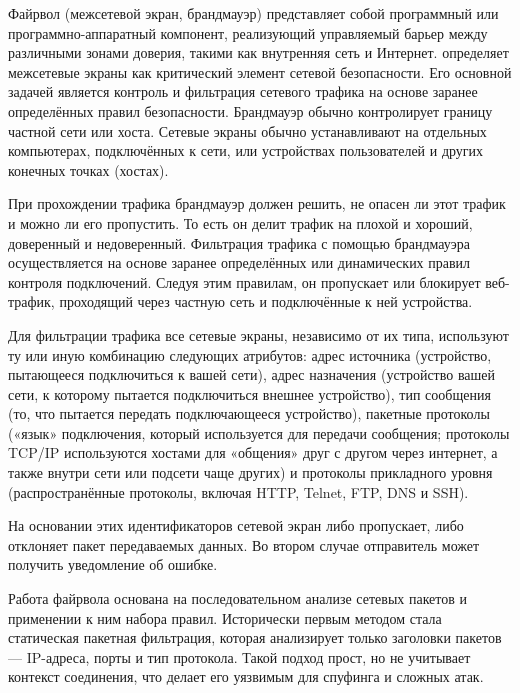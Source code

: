 \documentclass{SibFU-docs}
\begin{document}
Файрвол (межсетевой экран, брандмауэр) представляет собой программный или программно-аппаратный компонент, реализующий управляемый барьер между различными зонами доверия, такими как внутренняя сеть и Интернет. \cite{cheswick2003firewalls} определяет межсетевые экраны как критический элемент сетевой безопасности. Его основной задачей является контроль и фильтрация сетевого трафика на основе заранее определённых правил безопасности. Брандмауэр обычно контролирует границу частной сети или хоста. Сетевые экраны обычно устанавливают на отдельных компьютерах, подключённых к сети, или устройствах пользователей и других конечных точках (хостах).


При прохождении трафика брандмауэр должен решить, не опасен ли этот трафик и можно ли его пропустить. То есть он делит трафик на плохой и хороший, доверенный и недоверенный. Фильтрация трафика с помощью брандмауэра осуществляется на основе заранее определённых или динамических правил контроля подключений. Следуя этим правилам, он пропускает или блокирует веб-трафик, проходящий через частную сеть и подключённые к ней устройства.

Для фильтрации трафика все сетевые экраны, независимо от их типа, используют ту или иную комбинацию следующих атрибутов: адрес источника (устройство, пытающееся подключиться к вашей сети), адрес назначения (устройство вашей сети, к которому пытается подключиться внешнее устройство), тип сообщения (то, что пытается передать подключающееся устройство), пакетные протоколы («язык» подключения, который используется для передачи сообщения; протоколы TCP/IP используются хостами для «общения» друг с другом через интернет, а также внутри сети или подсети чаще других) и протоколы прикладного уровня (распространённые протоколы, включая HTTP, Telnet, FTP, DNS и SSH).

На основании этих идентификаторов сетевой экран либо пропускает, либо отклоняет пакет передаваемых данных. Во втором случае отправитель может получить уведомление об ошибке.

\vspace*{-1.5em}

Работа файрвола основана на последовательном анализе сетевых пакетов и применении к ним набора правил. Исторически первым методом стала статическая пакетная фильтрация, которая анализирует только заголовки пакетов --- IP-адреса, порты и тип протокола. Такой подход прост, но не учитывает контекст соединения, что делает его уязвимым для спуфинга и сложных атак.
\end{document}
